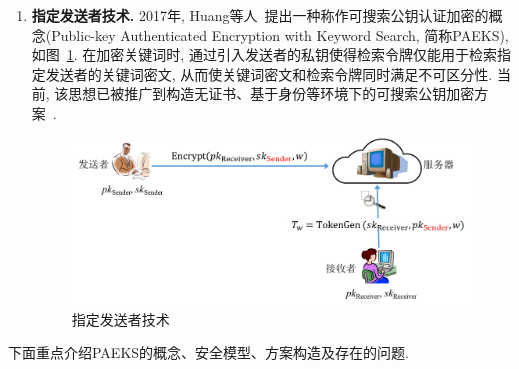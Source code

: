 \begin{enumerate}
\item \textbf{指定发送者技术.} 2017年, Huang等人~\cite{HL-InfSci-2017}提出一种称作可搜索公钥认证加密的概念(Public-key Authenticated Encryption with Keyword Search, 简称PAEKS), 如图~\ref{fig:ch6-PAEKS}. 在加密关键词时, 通过引入发送者的私钥使得检索令牌仅能用于检索指定发送者的关键词密文, 从而使关键词密文和检索令牌同时满足不可区分性. 当前, 该思想已被推广到构造无证书、基于身份等环境下的可搜索公钥加密方案~\cite{HMZKL-IEEE-TII-2018,LLYSTH-ProvSec-2019,CWZH-IEEE-CC-2022}.
\begin{figure}[h]
\centering
\includegraphics[scale = 0.5]{figure/ch6-PAEKS.png}
\caption{指定发送者技术} \label{fig:ch6-PAEKS}
\end{figure}
\end{enumerate}

下面重点介绍PAEKS的概念、安全模型、方案构造及存在的问题.

